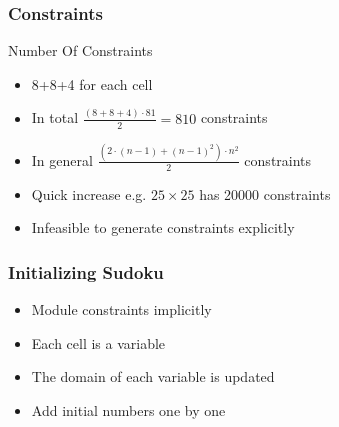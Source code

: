 \documentclass{beamer}
\newcounter{row}
\newcounter{col}
\newcommand\setrow[9]{
    \setcounter{col}{1}
    \foreach \n in {#1, #2, #3, #4, #5, #6, #7, #8, #9} {
        \edef\x{\value{col} - 0.5}
        \edef\y{9.5 - \value{row}}
        \node[digit,name={\arabic{row}-\arabic{col}}] at (\x, \y) {\n};
        \stepcounter{col}
    }
    \stepcounter{row}
}
\begin{document}
\begin{frame}
  \frametitle{Constraints}
  \begin{block}{Number Of Constraints}
    \begin{itemize}
    \item 8+8+4 for each cell
    \item In total $\frac{(8+8+4)\cdot 81}{2} = 810$ constraints
    \item In general $\frac{(2 \cdot (n-1) + (n-1)^2) \cdot n^2}{2}$ constraints
    \item Quick increase e.g. $25 \times 25$ has 20000 constraints 
    \item Infeasible to generate constraints explicitly 
    \end{itemize}
  \end{block}

  \begin{figure}
    \centering
  \end{figure}
\end{frame}

\begin{frame}
  \frametitle{Initializing Sudoku}
    \begin{itemize}
    \item Module constraints implicitly 
    \item Each cell is a variable
    \item The domain of each variable is updated
    \item Add initial numbers one by one
    \end{itemize}
\end{frame}
\end{document}
